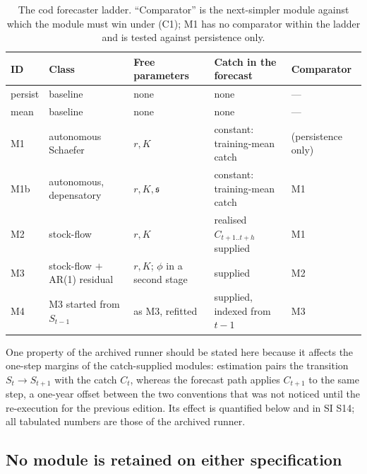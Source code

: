 \documentclass[preprint,11pt,authoryear]{elsarticle}
\theoremstyle{definition}
\theoremstyle{remark}
\newcommand{\sA}{\mathfrak{s}}
\begin{document}
\begin{table}[!htb]
\centering\small
\caption{The cod forecaster ladder. ``Comparator'' is the next-simpler module against which the module must win under (C1); M1 has no comparator within the ladder and is tested against persistence only.}
\label{tab:ladder}
\begin{tabularx}{\textwidth}{@{}l>{\raggedright\arraybackslash}p{}>{\raggedright\arraybackslash}p{}LL@{}}
\toprule
ID & Class & Free parameters & Catch in the forecast & Comparator \\
\midrule
persist & baseline & none & none & --- \\
mean & baseline & none & none & --- \\
M1 & autonomous Schaefer & $r,K$ & constant: training-mean catch & (persistence only) \\
M1b & autonomous, depensatory & $r,K,\sA$ & constant: training-mean catch & M1 \\
M2 & stock-flow & $r,K$ & realised $C_{t+1..t+h}$ supplied & M1 \\
M3 & stock-flow $+$ AR(1) residual & $r,K$; $\phi$ in a second stage & supplied & M2 \\
M4 & M3 started from $S_{t-1}$ & as M3, refitted & supplied, indexed from $t-1$ & M3 \\
\bottomrule
\end{tabularx}
\end{table}

One property of the archived runner should be stated here because it affects the one-step margins of the catch-supplied modules: estimation pairs the transition $S_t\to S_{t+1}$ with the catch $C_t$, whereas the forecast path applies $C_{t+1}$ to the same step, a one-year offset between the two conventions that was not noticed until the re-execution for the previous edition. Its effect is quantified below and in SI S14; all tabulated numbers are those of the archived runner.

\FloatBarrier
\subsection{No module is retained on either specification}\label{sec:pooled}
\end{document}
